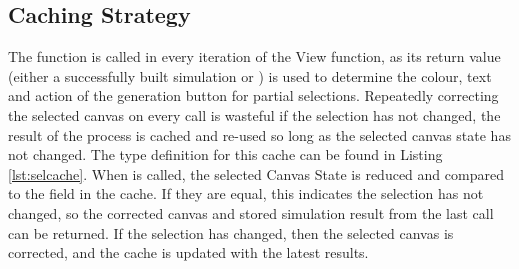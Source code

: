 \subsection{Caching Strategy}
The function  is called in every iteration of the View function, as its return value (either a successfully built simulation or ) is used to determine the colour, text and action of the generation button for partial selections. Repeatedly correcting the selected canvas on every call is wasteful if the selection has not changed, the result of the process is cached and re-used so long as the selected canvas state has not changed. The type definition for this cache can be found in Listing  \ref{lst:selcache}. When  is called, the selected Canvas State is reduced and compared to the  field in the cache. If they are equal, this indicates the selection has not changed, so the corrected canvas and stored simulation result from the last call can be returned. If the selection has changed, then the selected canvas is corrected, and the cache is updated with the latest results.

